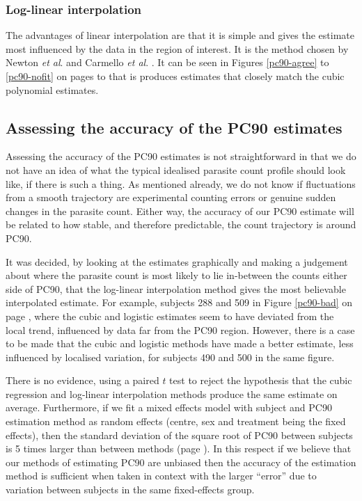 \subsubsection*{Log-linear interpolation}
The advantages of linear interpolation are that it is simple and gives the estimate most influenced by the data in the region of interest. It is the method chosen by Newton {\it et al}. and Carmello {\it et al}. \cite{newton, carmello}. It can be seen in Figures \ref{pc90-agree} to \ref{pc90-nofit} on pages \pageref{pc90-agree} to \pageref{pc90-nofit} that is produces estimates that closely match the cubic polynomial estimates.

\subsection{Assessing the accuracy of the PC90 estimates}
Assessing the accuracy of the PC90 estimates is not straightforward in that we do not have an idea of what the typical idealised parasite count profile should look like, if there is such a thing. As mentioned already, we do not know if fluctuations from a smooth trajectory are experimental counting errors or genuine sudden changes in the parasite count. Either way, the accuracy of our PC90 estimate will be related to how stable, and therefore predictable, the count trajectory is around PC90.

It was decided, by looking at the estimates graphically and making a judgement about where the parasite count is most likely to lie in-between the counts either side of PC90, that the log-linear interpolation method gives the most believable interpolated estimate. For example, subjects 288 and 509 in Figure \ref{pc90-bad} on page \pageref{pc90-bad}, where the cubic and logistic estimates seem to have deviated from the local trend, influenced by data far from the PC90 region. However, there is a case to be made that the cubic and logistic methods have made a better estimate, less influenced by localised variation, for subjects 490 and 500 in the same figure.

There is no evidence, using a paired $t$ test to reject the hypothesis that the cubic regression and log-linear interpolation methods produce the same estimate on average. Furthermore, if we fit a mixed effects model with subject and PC90 estimation method as random effects (centre, sex and treatment being the fixed effects), then the standard deviation of the square root of PC90 between subjects is 5 times larger than between methods (page \pageref{methods.lme}). In this respect if we believe that our methods of estimating PC90 are unbiased then the accuracy of the estimation method is sufficient when taken in context with the larger ``error'' due to variation between subjects in the same fixed-effects group.

